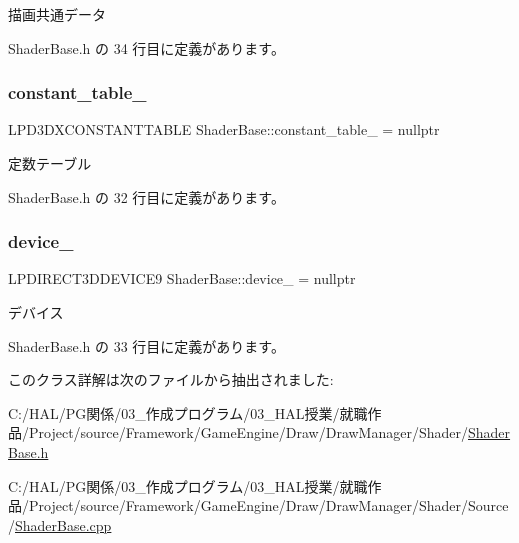 描画共通データ 



 Shader\+Base.\+h の 34 行目に定義があります。

\mbox{\label{class_shader_base_a9b6b2a5920dd57ac463040224fb64b68}} 
\subsubsection{\texorpdfstring{constant\+\_\+table\+\_\+}{constant\_table\_}}
{\footnotesize\ttfamily L\+P\+D3\+D\+X\+C\+O\+N\+S\+T\+A\+N\+T\+T\+A\+B\+LE Shader\+Base\+::constant\+\_\+table\+\_\+ = nullptr\hspace{0.3cm}{\ttfamily [private]}}



定数テーブル 



 Shader\+Base.\+h の 32 行目に定義があります。

\mbox{\label{class_shader_base_a15e4a4c1c1148433b9a0c60a7c32a366}} 
\subsubsection{\texorpdfstring{device\+\_\+}{device\_}}
{\footnotesize\ttfamily L\+P\+D\+I\+R\+E\+C\+T3\+D\+D\+E\+V\+I\+C\+E9 Shader\+Base\+::device\+\_\+ = nullptr\hspace{0.3cm}{\ttfamily [private]}}



デバイス 



 Shader\+Base.\+h の 33 行目に定義があります。



このクラス詳解は次のファイルから抽出されました\+:\begin{DoxyCompactItemize}
\item 
C\+:/\+H\+A\+L/\+P\+G関係/03\+\_\+作成プログラム/03\+\_\+\+H\+A\+L授業/就職作品/\+Project/source/\+Framework/\+Game\+Engine/\+Draw/\+Draw\+Manager/\+Shader/\mbox{\hyperlink{_shader_base_8h}{Shader\+Base.\+h}}\item 
C\+:/\+H\+A\+L/\+P\+G関係/03\+\_\+作成プログラム/03\+\_\+\+H\+A\+L授業/就職作品/\+Project/source/\+Framework/\+Game\+Engine/\+Draw/\+Draw\+Manager/\+Shader/\+Source/\mbox{\hyperlink{_shader_base_8cpp}{Shader\+Base.\+cpp}}\end{DoxyCompactItemize}
